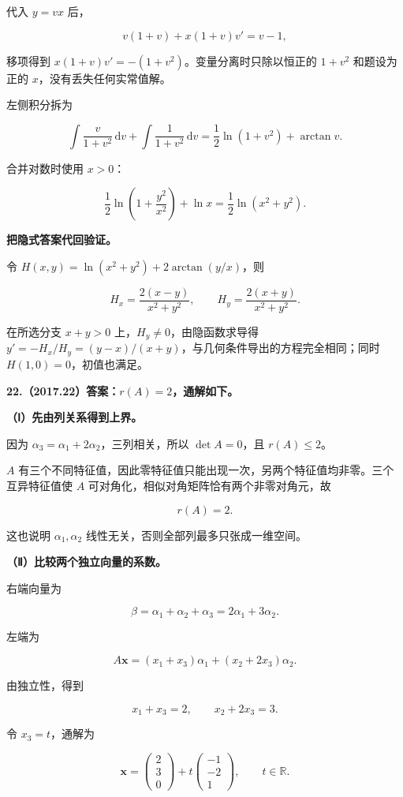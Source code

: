 \documentclass[UTF8,11pt,fontset=windows]{ctexart}
\begin{document}
代入 $y=vx$ 后，

$$
v(1+v)+x(1+v)v'=v-1,
$$

移项得到 $x(1+v)v'=-(1+v^2)$。变量分离时只除以恒正的 $1+v^2$ 和题设为正的 $x$，没有丢失任何实常值解。

左侧积分拆为

$$
\int\frac{v}{1+v^2}\,\mathrm dv+\int\frac1{1+v^2}\,\mathrm dv
=\frac12\ln(1+v^2)+\arctan v.
$$

合并对数时使用 $x>0$：

$$
\frac12\ln\left(1+\frac{y^2}{x^2}\right)+\ln x
=\frac12\ln(x^2+y^2).
$$

\textbf{把隐式答案代回验证。}

令 $H(x,y)=\ln(x^2+y^2)+2\arctan(y/x)$，则

$$
H_x=\frac{2(x-y)}{x^2+y^2},\qquad
H_y=\frac{2(x+y)}{x^2+y^2}.
$$

在所选分支 $x+y>0$ 上，$H_y\ne0$，由隐函数求导得 $y'=-H_x/H_y=(y-x)/(x+y)$，与几何条件导出的方程完全相同；同时 $H(1,0)=0$，初值也满足。

\clearpage

\textbf{22.（2017.22）答案：$r(A)=2$，通解如下。}

\textbf{（Ⅰ）先由列关系得到上界。}

因为 $\alpha_3=\alpha_1+2\alpha_2$，三列相关，所以 $\det A=0$，且 $r(A)\le2$。

$A$ 有三个不同特征值，因此零特征值只能出现一次，另两个特征值均非零。三个互异特征值使 $A$ 可对角化，相似对角矩阵恰有两个非零对角元，故

$$
r(A)=2.
$$

这也说明 $\alpha_1,\alpha_2$ 线性无关，否则全部列最多只张成一维空间。

\textbf{（Ⅱ）比较两个独立向量的系数。}

右端向量为

$$
\beta=\alpha_1+\alpha_2+\alpha_3=2\alpha_1+3\alpha_2.
$$

左端为

$$
A\boldsymbol x=(x_1+x_3)\alpha_1+(x_2+2x_3)\alpha_2.
$$

由独立性，得到

$$
x_1+x_3=2,\qquad x_2+2x_3=3.
$$

令 $x_3=t$，通解为

$$
\boldsymbol x=\begin{pmatrix}2\\3\\0\end{pmatrix}
+t\begin{pmatrix}-1\\-2\\1\end{pmatrix},\qquad t\in\mathbb R.
$$
\end{document}
